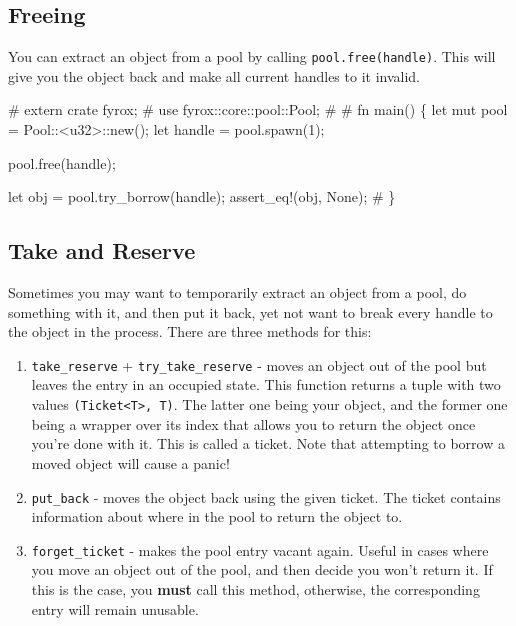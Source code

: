 \documentclass[
]{book}
\newenvironment{Shaded}{\begin{snugshade}}{\end{snugshade}}
\newcommand{\NormalTok}[1]{#1}
\providecommand{\tightlist}{%
  \setlength{\itemsep}{0pt}\setlength{\parskip}{0pt}}
\theoremstyle{definition}
\theoremstyle{definition}
\theoremstyle{definition}
\theoremstyle{definition}
\theoremstyle{remark}
\begin{document}
\subsection{Freeing}\label{freeing}

You can extract an object from a pool by calling \texttt{pool.free(handle)}. This will give you the object back and make all current handles to it invalid.

\begin{Shaded}
\begin{Highlighting}[]
\NormalTok{\# extern crate fyrox;}
\NormalTok{\# use fyrox::core::pool::Pool;}
\NormalTok{\#}
\NormalTok{\# fn main() \{}
\NormalTok{let mut pool = Pool::\textless{}u32\textgreater{}::new();}
\NormalTok{let handle = pool.spawn(1);}

\NormalTok{pool.free(handle);}

\NormalTok{let obj = pool.try\_borrow(handle);}
\NormalTok{assert\_eq!(obj, None);}
\NormalTok{\# \}}
\end{Highlighting}
\end{Shaded}

\subsection{Take and Reserve}\label{take-and-reserve}

Sometimes you may want to temporarily extract an object from a pool, do something with it, and then put it back, yet not want to break every handle to the object in the process. There are three methods for this:

\begin{enumerate}
\def\labelenumi{\arabic{enumi})}
\tightlist
\item
  \texttt{take\_reserve} + \texttt{try\_take\_reserve} - moves an object out of the pool but leaves the entry in an occupied state. This function returns a tuple with two values \texttt{(Ticket\textless{}T\textgreater{},\ T)}. The latter one being your object, and the former one being a wrapper over its index that allows you to return the object once you're done with it. This is called a ticket. Note that attempting to borrow a moved object will cause a panic!
\item
  \texttt{put\_back} - moves the object back using the given ticket. The ticket contains information about where in the pool to return the object to.
\item
  \texttt{forget\_ticket} - makes the pool entry vacant again. Useful in cases where you move an object out of the pool, and then decide you won't return it. If this is the case, you \textbf{must} call this method, otherwise, the corresponding entry will remain unusable.
\end{enumerate}
\end{document}

